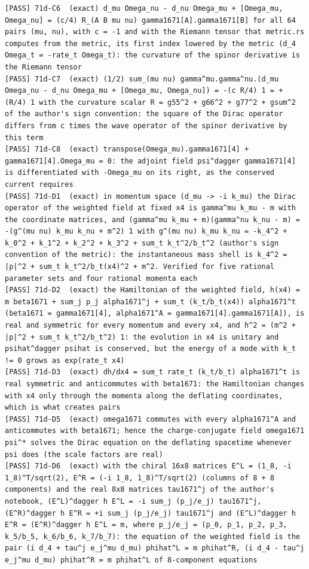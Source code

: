 \documentclass[
  10pt,
]{article}
\begin{document}
\begin{verbatim}
[PASS] 71d-C6  (exact) d_mu Omega_nu - d_nu Omega_mu + [Omega_mu, Omega_nu] = (c/4) R_(A B mu nu) gamma1671[A].gamma1671[B] for all 64 pairs (mu, nu), with c = -1 and with the Riemann tensor that metric.rs computes from the metric, its first index lowered by the metric (d_4 Omega_t = -rate_t Omega_t): the curvature of the spinor derivative is the Riemann tensor
[PASS] 71d-C7  (exact) (1/2) sum_(mu nu) gamma^mu.gamma^nu.(d_mu Omega_nu - d_nu Omega_mu + [Omega_mu, Omega_nu]) = -(c R/4) 1 = + (R/4) 1 with the curvature scalar R = g55^2 + g66^2 + g77^2 + gsum^2 of the author's sign convention: the square of the Dirac operator differs from c times the wave operator of the spinor derivative by this term
[PASS] 71d-C8  (exact) transpose(Omega_mu).gamma1671[4] + gamma1671[4].Omega_mu = 0: the adjoint field psi^dagger gamma1671[4] is differentiated with -Omega_mu on its right, as the conserved current requires
[PASS] 71d-D1  (exact) in momentum space (d_mu -> -i k_mu) the Dirac operator of the weighted field at fixed x4 is gamma^mu k_mu - m with the coordinate matrices, and (gamma^mu k_mu + m)(gamma^nu k_nu - m) = -(g^(mu nu) k_mu k_nu + m^2) 1 with g^(mu nu) k_mu k_nu = -k_4^2 + k_0^2 + k_1^2 + k_2^2 + k_3^2 + sum_t k_t^2/b_t^2 (author's sign convention of the metric): the instantaneous mass shell is k_4^2 = |p|^2 + sum_t k_t^2/b_t(x4)^2 + m^2. Verified for five rational parameter sets and four rational momenta each
[PASS] 71d-D2  (exact) the Hamiltonian of the weighted field, h(x4) = m beta1671 + sum_j p_j alpha1671^j + sum_t (k_t/b_t(x4)) alpha1671^t (beta1671 = gamma1671[4], alpha1671^A = gamma1671[4].gamma1671[A]), is real and symmetric for every momentum and every x4, and h^2 = (m^2 + |p|^2 + sum_t k_t^2/b_t^2) 1: the evolution in x4 is unitary and psihat^dagger psihat is conserved, but the energy of a mode with k_t != 0 grows as exp(rate_t x4)
[PASS] 71d-D3  (exact) dh/dx4 = sum_t rate_t (k_t/b_t) alpha1671^t is real symmetric and anticommutes with beta1671: the Hamiltonian changes with x4 only through the momenta along the deflating coordinates, which is what creates pairs
[PASS] 71d-D5  (exact) omega1671 commutes with every alpha1671^A and anticommutes with beta1671; hence the charge-conjugate field omega1671 psi^* solves the Dirac equation on the deflating spacetime whenever psi does (the scale factors are real)
[PASS] 71d-D6  (exact) with the chiral 16x8 matrices E^L = (1_8, -i 1_8)^T/sqrt(2), E^R = (-i 1_8, 1_8)^T/sqrt(2) (columns of 8 + 8 components) and the real 8x8 matrices tau1671^j of the author's notebook, (E^L)^dagger h E^L = -i sum_j (p_j/e_j) tau1671^j, (E^R)^dagger h E^R = +i sum_j (p_j/e_j) tau1671^j and (E^L)^dagger h E^R = (E^R)^dagger h E^L = m, where p_j/e_j = (p_0, p_1, p_2, p_3, k_5/b_5, k_6/b_6, k_7/b_7): the equation of the weighted field is the pair (i d_4 + tau^j e_j^mu d_mu) phihat^L = m phihat^R, (i d_4 - tau^j e_j^mu d_mu) phihat^R = m phihat^L of 8-component equations

\end{verbatim}
\end{document}
